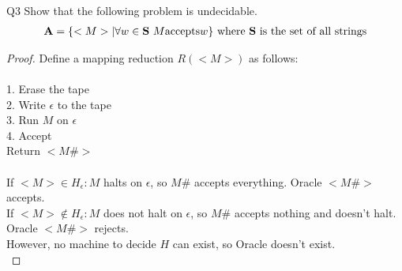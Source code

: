 \begin{problem}
    {Q3}
    Show that the following problem is undecidable. \\
    \begin{align*}
        \textbf{A} = \{<M> | \forall w \in \textbf{S}~M \text{accepts} w\} \text{ where \textbf{S} is the set of all strings}
    \end{align*}
    \begin{proof}
        Define a mapping reduction $R(<M>)$ as follows: \\\\
        1. Erase the tape \\
        2. Write $\epsilon$ to the tape \\
        3. Run $M$ on $\epsilon$ \\
        4. Accept \\
        Return $<M\#>$ \\\\
        If $<M> \in H_\epsilon: M$ halts on $\epsilon$, so $M\#$ accepts everything. Oracle $<M\#>$ accepts. \\
        If $<M> \not\in H_\epsilon: M$ does not halt on $\epsilon$, so $M\#$ accepts nothing and doesn't halt. Oracle $<M\#>$ rejects. \\
        However, no machine to decide $H$ can exist, so Oracle doesn't exist. \\
    \end{proof}
\end{problem}
